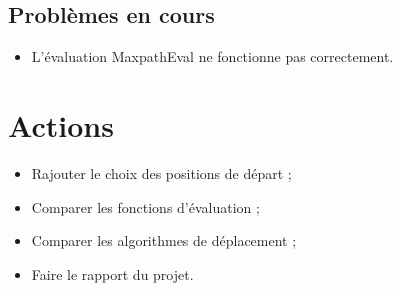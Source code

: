 \documentclass[a4paper]{article}
\begin{document}
	\subsection*{Problèmes en cours}
		\begin{itemize}
			\item L'évaluation MaxpathEval ne fonctionne pas correctement.
		\end{itemize}

\section*{Actions}
	\begin{itemize}
		\item Rajouter le choix des positions de départ ;
		\item Comparer les fonctions d'évaluation ;
		\item Comparer les algorithmes de déplacement ;
		\item Faire le rapport du projet.
	\end{itemize}
\end{document}
